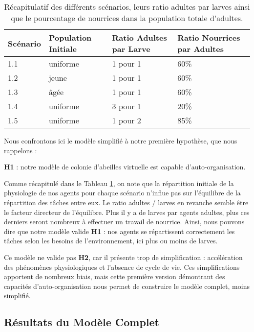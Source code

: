 	\begin{table}
		\centering
		\begin{tabular}{l|l|l|l}
    	Scénario & Population Initiale & Ratio Adultes par Larve & Ratio Nourrices par Adultes \\
   		\hline
   		1.1 & uniforme & 1 pour 1 & 60\% \\
   		1.2 & jeune & 1 pour 1 & 60\% \\
   		1.3 & âgée & 1 pour 1 & 60\% \\
   		1.4 & uniforme & 3 pour 1 & 20\% \\
   		1.5 & uniforme & 1 pour 2 & 85\% \\
		\end{tabular}	
		\caption{Récapitulatif des différents scénarios, leurs ratio adultes par larves ainsi que le pourcentage de nourrices dans la population totale d'adultes.}	
   		\label{TabEnvConstant}
	\end{table}	
	
		Nous confrontons ici le modèle simplifié à notre première hypothèse, que nous rappelons :
				
		\textbf{H1} : notre modèle de colonie d'abeilles virtuelle est capable d'auto-organisation.
		
		Comme récapitulé dans le Tableau \ref{TabEnvConstant}, on note que la répartition initiale de la physiologie de nos agents pour chaque scénario n'influe pas sur l'équilibre de la répartition des tâches entre eux. Le ratio adultes / larves en revanche semble être le facteur directeur de l'équilibre. Plus il y a de larves par agents adultes, plus ces derniers seront nombreux à effectuer un travail de nourrice. Ainsi, nous pouvons dire que notre modèle valide \textbf{H1} : nos agents se répartissent correctement les tâches selon les besoins de l'environnement, ici plus ou moins de larves.
		
		Ce modèle ne valide pas \textbf{H2}, car il présente trop de simplification : accélération des phénomènes physiologiques et l'absence de cycle de vie. Ces simplifications apportent de nombreux biais, mais cette première version démontrant des capacités d'auto-organisation nous permet de construire le modèle complet, moins simplifié.
	
	\subsection{Résultats du Modèle Complet}		
		
